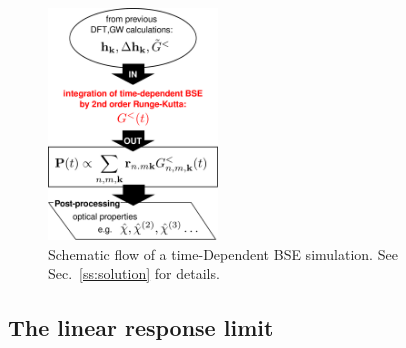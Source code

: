 
\begin{figure}
\begin{center}
        \includegraphics[width=0.4\textwidth]{Figures/scheme-tdbse}
\caption{\footnotesize{
Schematic flow of a time-Dependent BSE simulation. See
Sec.~\ref{ss:solution} for details.}} \label{fg:scheme}
\end{center}
\end{figure}

\subsection{The linear response limit}
\label{linear_response}


